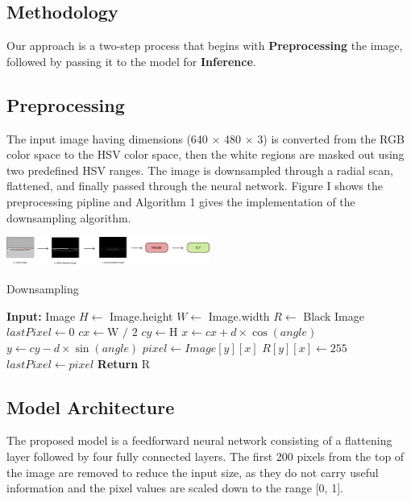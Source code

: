 \documentclass[a4paper]{article}
\begin{document}
\begin{multicols}{2}
\section{Methodology}
\par \noindent Our approach is a two-step process that begins with \textbf{Preprocessing} the image,
followed by passing it to the model for \textbf{Inference}.
\subsection{Preprocessing}
\par \noindent The input image having dimensions (640 $\times$ 480 $\times$ 3) is converted from the RGB color space to the HSV color space, then the white regions are masked out using two predefined HSV ranges.
The image is downsampled through a radial scan, flattened, and finally passed through the neural network.
Figure I shows the preprocessing pipline and Algorithm 1 gives the implementation of the downsampling algorithm.

\par \noindent

{ \centering
  \includegraphics[width=0.5\textwidth]{../results/Flowchart.png}\\
  \label{fig:flowchart}
}
\begin{algorithm}[H]
  \caption{Downsampling}
\begin{algorithmic}[1]
\Statex \textbf{Input: }Image
\State $H \gets$ Image.height
\State $W \gets$ Image.width
\State $R \gets$ Black Image
    \State $lastPixel \gets 0$
    \State $cx \gets \text{W / 2}$
    \State $cy \gets \text{H}$
        \State $x \gets cx + d \times \cos(angle)$
        \State $y \gets cy - d \times \sin(angle)$
          \State $pixel \gets Image[y][x]$
            \State $R[y][x] \gets 255 $ 
          \EndIf
          \State $lastPixel \gets pixel$
        \EndIf
    \EndFor
\EndFor
\State \textbf{Return} R
\end{algorithmic}
\end{algorithm}

\subsection{Model Architecture}
\par \noindent
The proposed model is a feedforward neural network consisting of a flattening layer followed 
by four fully connected layers. The first 200 pixels from the top of the image are removed 
to reduce the input size, as they do not carry useful information and the pixel values are scaled
down to the range [0, 1].


\end{multicols}
\end{document}
